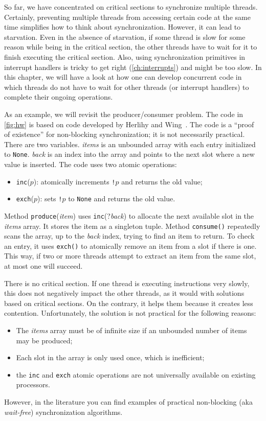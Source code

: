 \documentclass{report}
\begin{document}
So far, we have concentrated on critical sections to synchronize multiple
threads.  Certainly, preventing multiple threads from accessing
certain code at the same time simplifies how to think about synchronization.
However, it can lead to starvation.  Even in the absence of starvation,
if some thread is slow for some reason while being in the critical section,
the other threads have to wait for it to finish executing the critical section.
Also, using synchronization primitives in interrupt handlers is tricky
to get right (\autoref{ch:interrupts}) and might be too slow.
In this chapter, we will have a look at how one can develop concurrent
code in which threads do not have to wait for other threads (or interrupt
handlers) to complete their ongoing operations.

As an example, we will revisit the producer/consumer problem.
The code in \autoref{fig:hw} is based on code developed by Herlihy and
Wing~\cite{HW87}.
The code is a ``proof of existence'' for non-blocking synchronization; it
is not necessarily practical.
There are two variables.  \textit{items} is an unbounded array with each
entry initialized to \texttt{None}.  \textit{back} is an index into the
array and points to the next slot where a new value is inserted.
The code uses two atomic operations:
\begin{itemize}
\item \texttt{inc}($p$): atomically increments \texttt{!}$p$ and returns
the old value;
\item \texttt{exch}($p$): sets \texttt{!}$p$ to \texttt{None} and returns
the old value.
\end{itemize}

Method \texttt{produce}(\textit{item}) uses \texttt{inc}(?\textit{back})
to allocate
the next available slot in the \textit{items} array.
It stores the item as a singleton tuple.
Method \texttt{consume()} repeatedly scans the array, up to the
\textit{back} index, trying to find an item to return.
To check an entry, it uses \texttt{exch()}
to atomically remove an item from a slot if there is one.
This way, if two or more threads attempt to extract an item from
the same slot, at most one will succeed.

There is no critical section.  If one thread is executing instructions
very slowly, this does not negatively impact the other threads, as it
would with solutions based on critical sections.
On the contrary, it helps them because it creates less contention.
Unfortunately, the solution is not practical for the following reasons:
\begin{itemize}
\item The \textit{items} array must be of infinite size if an unbounded number
of items may be produced;
\item Each slot in the array is only used once, which is inefficient;
\item the \texttt{inc} and \texttt{exch} atomic operations are not
universally available on existing processors.
\end{itemize}
However, in the literature you can find examples of practical
non-blocking (aka \emph{wait-free})
%
synchronization algorithms.
\end{document}

